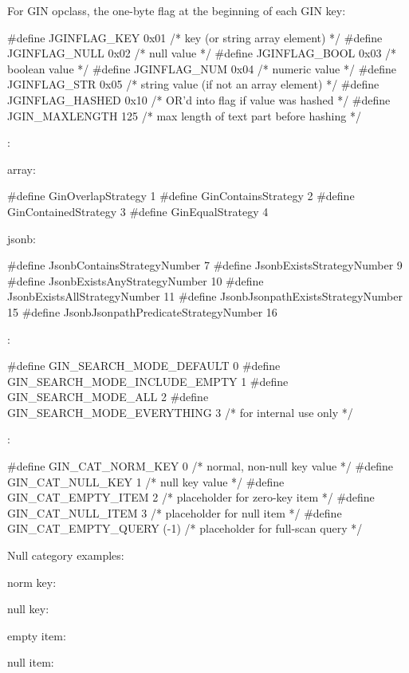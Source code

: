 For  GIN opclass, the one-byte flag at the beginning of
each GIN key:

\begin{ccode}
#define JGINFLAG_KEY    0x01    /* key (or string array element) */
#define JGINFLAG_NULL   0x02    /* null value */
#define JGINFLAG_BOOL   0x03    /* boolean value */
#define JGINFLAG_NUM    0x04    /* numeric value */
#define JGINFLAG_STR    0x05    /* string value (if not an array element) */
#define JGINFLAG_HASHED 0x10    /* OR'd into flag if value was hashed */
#define JGIN_MAXLENGTH  125     /* max length of text part before hashing */
\end{ccode}

:

\begin{oparts}
\item array:
  \begin{ccode}
#define GinOverlapStrategy      1
#define GinContainsStrategy     2
#define GinContainedStrategy    3
#define GinEqualStrategy        4
  \end{ccode}
\item jsonb:
  \begin{ccode}
#define JsonbContainsStrategyNumber   7
#define JsonbExistsStrategyNumber   9
#define JsonbExistsAnyStrategyNumber  10
#define JsonbExistsAllStrategyNumber  11
#define JsonbJsonpathExistsStrategyNumber   15
#define JsonbJsonpathPredicateStrategyNumber  16
  \end{ccode}
\end{oparts}

:

\begin{ccode}
#define GIN_SEARCH_MODE_DEFAULT         0
#define GIN_SEARCH_MODE_INCLUDE_EMPTY   1
#define GIN_SEARCH_MODE_ALL             2
#define GIN_SEARCH_MODE_EVERYTHING      3   /* for internal use only */
\end{ccode}

:

\begin{ccode}
#define GIN_CAT_NORM_KEY        0   /* normal, non-null key value */
#define GIN_CAT_NULL_KEY        1   /* null key value */
#define GIN_CAT_EMPTY_ITEM      2   /* placeholder for zero-key item */
#define GIN_CAT_NULL_ITEM       3   /* placeholder for null item */
#define GIN_CAT_EMPTY_QUERY     (-1)    /* placeholder for full-scan query */
\end{ccode}

Null category examples:

\begin{oparts}
\item norm key:
\item null key:
\item empty item:
\item null item:
\end{oparts}
